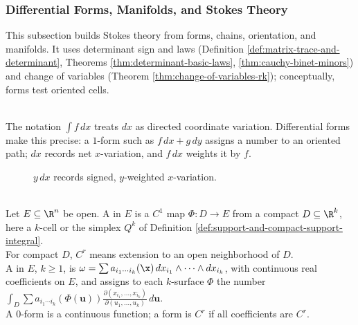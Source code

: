 \subsubsection{Differential Forms, Manifolds, and Stokes Theory}

This subsection builds Stokes theory from forms, chains, orientation, and manifolds. It uses determinant sign and laws (Definition \ref{def:matrix-trace-and-determinant}, Theorems \ref{thm:determinant-basic-laws}, \ref{thm:cauchy-binet-minors}) and change of variables (Theorem \ref{thm:change-of-variables-rk}); conceptually, forms test oriented cells.

\begin{perspective} \label{per:differential-forms-as-functionals} \\
The notation $\int f\,dx$ treats $dx$ as directed coordinate variation. Differential forms make this precise: a $1$-form such as $f\,dx+g\,dy$ assigns a number to an oriented path; $dx$ records net $x$-variation, and $f\,dx$ weights it by $f$.
\end{perspective}

\begin{figure}[H]
  \centering
  
  \caption{$y\,dx$ records signed, $y$-weighted $x$-variation.}
  \label{fig:forms-weighted-variation-paths}
\end{figure}

\begin{definition} \label{def:forms-manifolds-core-source-todo}\label{def:k-surfaces-and-differential-forms} \\
Let $E\subseteq\R^n$ be open. A  in $E$ is a $C^1$ map $\Phi:D\to E$ from a compact  $D\subseteq\R^k$, here a $k$-cell or the simplex $Q^k$ of Definition \ref{def:support-and-compact-support-integral}.\\
For compact $D$, $C^r$ means extension to an open neighborhood of $D$.\\
A  in $E$, $k\geq1$, is $\omega=\sum a_{i_1\cdots i_k}(\x)\,dx_{i_1}\wedge\cdots\wedge dx_{i_k}$, with continuous real coefficients on $E$, and assigns to each $k$-surface $\Phi$ the number $\int_D \sum a_{i_1\cdots i_k}(\Phi(\mathbf{u})) \frac{\partial(x_{i_1},\ldots,x_{i_k})}{\partial(u_1,\ldots,u_k)}\,d\mathbf{u}$.\\
A $0$-form is a continuous function; a form is $C^r$ if all coefficients are $C^r$.
\end{definition}

